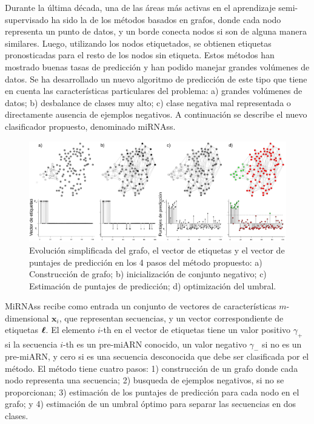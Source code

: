 Durante la última década, una de las áreas más activas en el aprendizaje semi-supervisado ha sido la de los métodos basados en grafos, donde cada nodo
representa un punto de datos, y un borde conecta nodos si son de alguna manera similares. Luego, utilizando los nodos etiquetados, se obtienen etiquetas
pronosticadas para el resto de los nodos sin etiqueta. Estos métodos han mostrado buenas tasas de predicción \citep{joachims2003transductive} y han podido
manejar grandes volúmenes de datos. Se ha desarrollado un nuevo algoritmo de predicción de este tipo que tiene en cuenta las características particulares del
problema: a) grandes volúmenes de datos; b) desbalance de clases muy alto; c) clase negativa mal representada o directamente ausencia de ejemplos negativos. A
continuación se describe el nuevo clasificador propuesto, denominado miRNAss.

\begin{figure}[tpb]
	\centering
	\includegraphics[width=\linewidth]{fig/workflow.eps}
	\caption[Evolución del grafo]{Evolución simplificada del grafo, el vector de etiquetas y el vector de puntajes de predicción en los 4 pasos del método
	propuesto: a) Construcción de grafo; b) inicialización de conjunto negativo; c) Estimación de puntajes de predicción; d) optimización del umbral.}
	\label{fig:workflow}
\end{figure}

MiRNAss recibe como entrada un conjunto de vectores de características $m$-dimensional $\mathbf{x}_{i}$, que representan secuencias, y un vector
correspondiente de etiquetas $\boldsymbol\ell$. El elemento $i$-th en el vector de etiquetas tiene un valor positivo $\gamma_{+}$ si la secuencia $i$-th es un pre-miARN
conocido, un valor negativo $\gamma_{-}$ si no es un pre-miARN, y cero si es una secuencia desconocida que debe ser clasificada por el método. El método
tiene cuatro pasos: 1) construcción de un grafo donde cada nodo representa una secuencia; 2) busqueda de ejemplos negativos, si no se proporcionan; 3) estimación
de los puntajes de predicción para cada nodo en el grafo; y 4) estimación de un umbral óptimo para separar las secuencias en dos clases.

